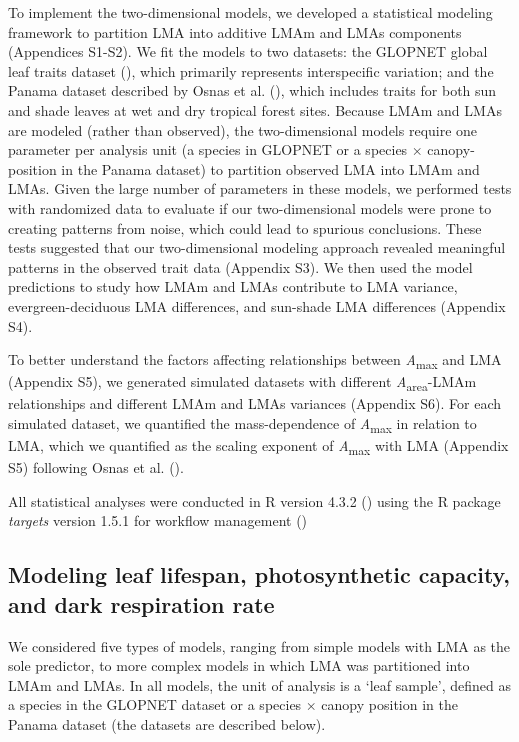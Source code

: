 \documentclass[
  12pt,
  letterpaper,
  DIV=11,
  numbers=noendperiod]{scrartcl}
\begin{document}
To implement the two-dimensional models, we developed a statistical
modeling framework to partition LMA into additive LMAm and LMAs
components (Appendices S1-S2). We fit the models to two datasets: the
GLOPNET global leaf traits dataset (), which primarily represents interspecific variation; and the
Panama dataset described by Osnas et al.
(), which includes traits for both sun and
shade leaves at wet and dry tropical forest sites. Because LMAm and LMAs
are modeled (rather than observed), the two-dimensional models require
one parameter per analysis unit (a species in GLOPNET or a species
\(\times\) canopy-position in the Panama dataset) to partition observed
LMA into LMAm and LMAs. Given the large number of parameters in these
models, we performed tests with randomized data to evaluate if our
two-dimensional models were prone to creating patterns from noise, which
could lead to spurious conclusions. These tests suggested that our
two-dimensional modeling approach revealed meaningful patterns in the
observed trait data (Appendix S3). We then used the model predictions to
study how LMAm and LMAs contribute to LMA variance, evergreen-deciduous
LMA differences, and sun-shade LMA differences (Appendix S4).

To better understand the factors affecting relationships between
\emph{A}\textsubscript{max} and LMA (Appendix S5), we generated
simulated datasets with different \emph{A}\textsubscript{area}-LMAm
relationships and different LMAm and LMAs variances (Appendix S6). For
each simulated dataset, we quantified the mass-dependence of
\emph{A}\textsubscript{max} in relation to LMA, which we quantified as
the scaling exponent of \emph{A}\textsubscript{max} with LMA (Appendix
S5) following Osnas et al. ().

All statistical analyses were conducted in R version 4.3.2
() using the R package
\emph{targets} version 1.5.1 for workflow management
()

\subsection{Modeling leaf lifespan, photosynthetic capacity, and dark
respiration
rate}\label{modeling-leaf-lifespan-photosynthetic-capacity-and-dark-respiration-rate}

We considered five types of models, ranging from simple models with LMA
as the sole predictor, to more complex models in which LMA was
partitioned into LMAm and LMAs. In all models, the unit of analysis is a
`leaf sample', defined as a species in the GLOPNET dataset or a species
\(\times\) canopy position in the Panama dataset (the datasets are
described below).
\end{document}
